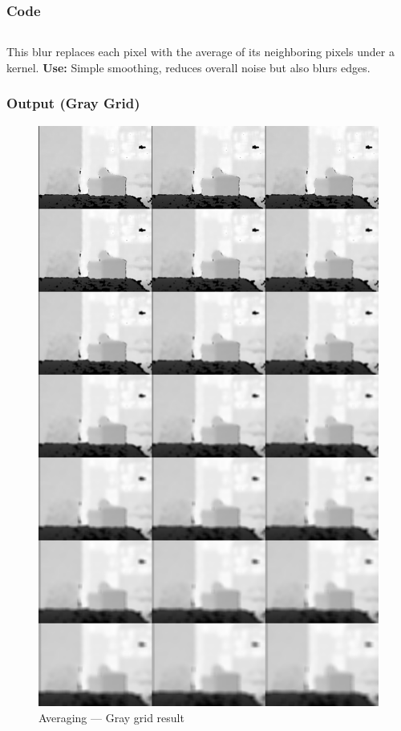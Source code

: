 \documentclass[a4paper,11pt]{article}
\begin{document}
	\subsubsection*{Code}
	\inputminted{python}{Python_Files/04_average_blur.py}
	
	This blur replaces each pixel with the average of its neighboring pixels under a kernel.  
	\textbf{Use:} Simple smoothing, reduces overall noise but also blurs edges.
	

	
	\subsubsection*{Output (Gray Grid)}
	\begin{figure}[H]
		\centering
		\includegraphics[width=\textwidth,height=0.9\textheight,keepaspectratio]{Images/04_average_gray_grid.png}
		\caption{Averaging — Gray grid result}
	\end{figure}
	\clearpage
	
\end{document}
